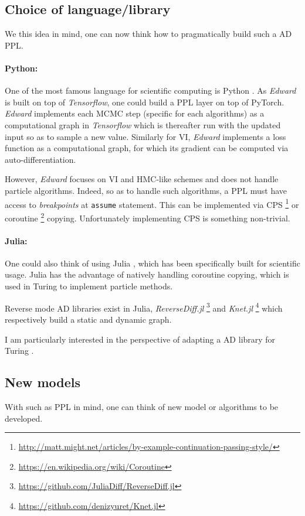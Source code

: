 \subsection{Choice of language/library}
We this idea in mind, one can now think how to pragmatically build such a \gls{AD} \gls{PPL}.

\paragraph{Python:}
One of the most famous language for scientific computing is Python \cite{Rossum:1995:PRM:869369}.
As \emph{Edward} \cite{Edward} is built on top of \emph{Tensorflow}, one could build a \gls{PPL} layer on top of PyTorch. \emph{Edward} implements each \gls{MCMC} step (specific for each algorithms) as a computational graph in \emph{Tensorflow} which is thereafter run with the updated input so as to sample a new value. Similarly for \gls{VI}, \emph{Edward} implements a loss function as a computational graph, for which its gradient can be computed via auto-differentiation.

However, \emph{Edward} focuses on \gls{VI} and \gls{HMC}-like schemes and does not handle particle algorithms.
Indeed, so as to handle such algorithms, a \gls{PPL} must have access to \textit{breakpoints} at \texttt{assume} statement. This can be implemented via \gls{CPS} \footnote{\url{http://matt.might.net/articles/by-example-continuation-passing-style/}} or coroutine \footnote{\url{https://en.wikipedia.org/wiki/Coroutine}} copying. Unfortunately implementing \gls{CPS} is something non-trivial.

\paragraph{Julia:}
One could also think of using Julia \cite{Bezanson:2017gd}, which has been specifically built for scientific usage. Julia has the advantage of natively handling coroutine copying, which is used in Turing \cite{Turing} to implement particle methods.

Reverse mode \gls{AD} libraries exist in Julia, \emph{ReverseDiff.jl} \footnote{\url{https://github.com/JuliaDiff/ReverseDiff.jl}} and \emph{Knet.jl} \footnote{\url{https://github.com/denizyuret/Knet.jl}} which respectively build a static and dynamic graph.

I am particularly interested in the perspective of adapting a \gls{AD} library for Turing \cite{Turing}.

\subsection{New models}
With such as \gls{PPL} in mind, one can think of new model or algorithms to be developed.

